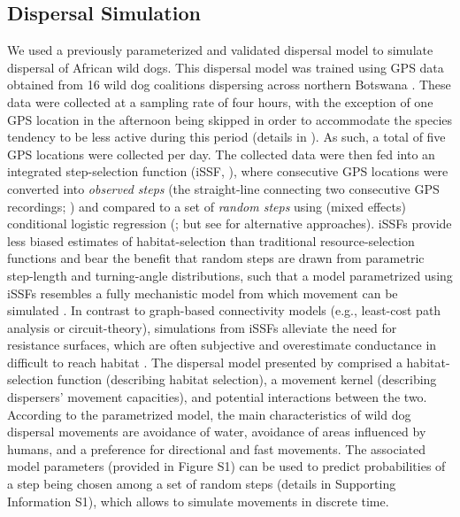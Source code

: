 \documentclass[abstract=on,10pt,a4paper,bibliography=totocnumbered]{article}
\begin{document}
\subsection{Dispersal Simulation}

We used a previously parameterized and validated dispersal model to simulate
dispersal of African wild dogs. This dispersal model was trained using GPS data
obtained from 16 wild dog coalitions dispersing across northern Botswana
\citep{Hofmann.2023}. These data were collected at a sampling rate of four
hours, with the exception of one GPS location in the afternoon being skipped in
order to accommodate the species tendency to be less active during this period
(details in \citealp{Cozzi.2020, Hofmann.2021}). As such, a total of five GPS
locations were collected per day. The collected data were then fed into an
integrated step-selection function (iSSF, \citealp{Avgar.2016}), where
consecutive GPS locations were converted into \textit{observed steps} (the
straight-line connecting two consecutive GPS recordings; \citealp{Turchin.1998})
and compared to a set of \textit{random steps} using (mixed effects) conditional
logistic regression (\citealp{Fortin.2005, Thurfjell.2014, Muff.2020,
Fieberg.2021}; but see \citealp{Michelot.2024} for alternative approaches).
iSSFs provide less biased estimates of habitat-selection than traditional
resource-selection functions \citep{Forester.2009, Zeller.2016} and bear the
benefit that random steps are drawn from parametric step-length and
turning-angle distributions, such that a model parametrized using iSSFs
resembles a fully mechanistic model from which movement can be simulated
\citep{Signer.2017, Potts.2023, Signer.2023}. In contrast to graph-based
connectivity models (e.g., least-cost path analysis or circuit-theory),
simulations from iSSFs alleviate the need for resistance surfaces, which are
often subjective \citep{Simpkins.2017, Marrec.2020} and overestimate conductance
in difficult to reach habitat \citep{Signer.2017, Hofmann.2023}. The dispersal
model presented by \citet{Hofmann.2023} comprised a habitat-selection function
(describing habitat selection), a movement kernel (describing dispersers'
movement capacities), and potential interactions between the two. According to
the parametrized model, the main characteristics of wild dog dispersal movements
are avoidance of water, avoidance of areas influenced by humans, and a
preference for directional and fast movements. The associated model parameters
(provided in Figure S1) can be used to predict probabilities of a step being
chosen among a set of random steps (details in Supporting Information S1), which
allows to simulate movements in discrete time.
\end{document}
